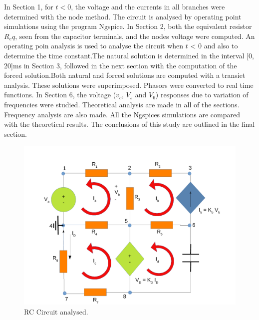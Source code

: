 \par 
In Section 1, for $t < 0$, the voltage and the currents in all branches were determined with the node method. The circuit is analysed by operating point simulations using the program Ngspice. In Section 2, both the equivalent resistor $R_eq$, seen from the capacitor terminals, and the nodes voltage were computed. An operating poin analysis is used to analyse the circuit when $t$ < $0$ and also to determine the time constant.The natural solution is determined in the interval [0, 20]ms in Section 3, followed in the next section with the computation of the forced solution.Both natural and forced solutions are computed with a transiet analysis. These solutions were superimposed. Phasors were converted to real time functions. In Section 6, the voltage ($v_c$, $V_s$ and $V_6$) responses due to variation of frequencies were studied. Theoretical analysis are made in all of the sections. Frequency analysis are also made. All the Ngspices simulations are compared with the theoretical results.
The conclusions of this study are outlined in the final section.



\begin{figure}[ht] \centering
\includegraphics[width=0.9\linewidth]{t2draw.pdf}
\caption{ RC Circuit analysed.}
\label{RC Circuit.}
\end{figure}

















